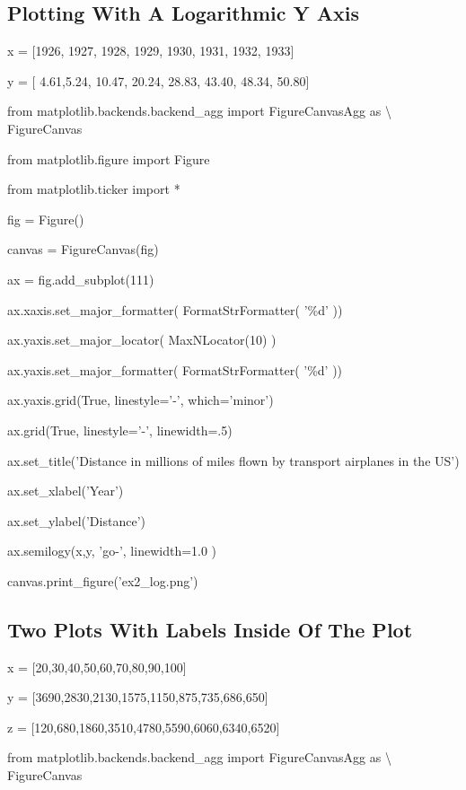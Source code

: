 \documentclass[12pt,oneside]{book}
\begin{document}
{\textbar}


\subsection[Plotting With A Logarithmic Y Axis]{ Plotting With A Logarithmic Y Axis}

x = [1926, 1927, 1928, 1929, 1930, 1931, 1932, 1933]

y = [ 4.61,5.24, 10.47, 20.24, 28.83, 43.40, 48.34, 50.80]


from matplotlib.backends.backend\_agg import FigureCanvasAgg as
{\textbackslash} FigureCanvas

from matplotlib.figure import Figure

from matplotlib.ticker import *

fig = Figure()

canvas = FigureCanvas(fig)

ax = fig.add\_subplot(111)

ax.xaxis.set\_major\_formatter( FormatStrFormatter(
'\%d' ))

ax.yaxis.set\_major\_locator( MaxNLocator(10) )

ax.yaxis.set\_major\_formatter( FormatStrFormatter(
'\%d' ))

ax.yaxis.grid(True, linestyle='{}-',
which='minor')

ax.grid(True, linestyle='{}-',
linewidth=.5)

ax.set\_title('Distance in millions of miles flown by
transport airplanes in the US')

ax.set\_xlabel('Year')

ax.set\_ylabel('Distance')

ax.semilogy(x,y, 'go{}-',
linewidth=1.0 )

canvas.print\_figure('ex2\_log.png')

{\textbar}


\subsection[Two Plots With Labels Inside Of The Plot]{ Two Plots With Labels Inside Of The Plot}

x = [20,30,40,50,60,70,80,90,100]

y = [3690,2830,2130,1575,1150,875,735,686,650]

z = [120,680,1860,3510,4780,5590,6060,6340,6520]


from matplotlib.backends.backend\_agg import FigureCanvasAgg as
{\textbackslash} FigureCanvas
\end{document}
